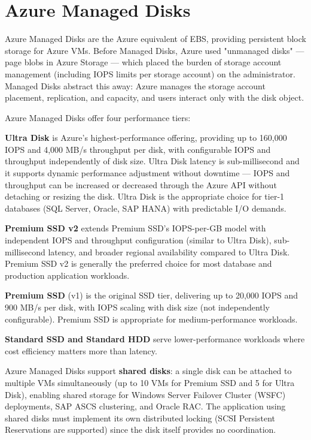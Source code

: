 \section{Azure Managed Disks}
Azure Managed Disks are the Azure equivalent of EBS, providing persistent block storage for Azure VMs. Before Managed Disks, Azure used "unmanaged disks" --- page blobs in Azure Storage --- which placed the burden of storage account management (including IOPS limits per storage account) on the administrator. Managed Disks abstract this away: Azure manages the storage account placement, replication, and capacity, and users interact only with the disk object.

Azure Managed Disks offer four performance tiers:

\textbf{Ultra Disk} is Azure's highest-performance offering, providing up to 160,000 IOPS and 4,000 MB/s throughput per disk, with configurable IOPS and throughput independently of disk size. Ultra Disk latency is sub-millisecond and it supports dynamic performance adjustment without downtime --- IOPS and throughput can be increased or decreased through the Azure API without detaching or resizing the disk. Ultra Disk is the appropriate choice for tier-1 databases (SQL Server, Oracle, SAP HANA) with predictable I/O demands.

\textbf{Premium SSD v2} extends Premium SSD's IOPS-per-GB model with independent IOPS and throughput configuration (similar to Ultra Disk), sub-millisecond latency, and broader regional availability compared to Ultra Disk. Premium SSD v2 is generally the preferred choice for most database and production application workloads.

\textbf{Premium SSD} (v1) is the original SSD tier, delivering up to 20,000 IOPS and 900 MB/s per disk, with IOPS scaling with disk size (not independently configurable). Premium SSD is appropriate for medium-performance workloads.

\textbf{Standard SSD and Standard HDD} serve lower-performance workloads where cost efficiency matters more than latency.

Azure Managed Disks support \textbf{shared disks}: a single disk can be attached to multiple VMs simultaneously (up to 10 VMs for Premium SSD and 5 for Ultra Disk), enabling shared storage for Windows Server Failover Cluster (WSFC) deployments, SAP ASCS clustering, and Oracle RAC. The application using shared disks must implement its own distributed locking (SCSI Persistent Reservations are supported) since the disk itself provides no coordination.

